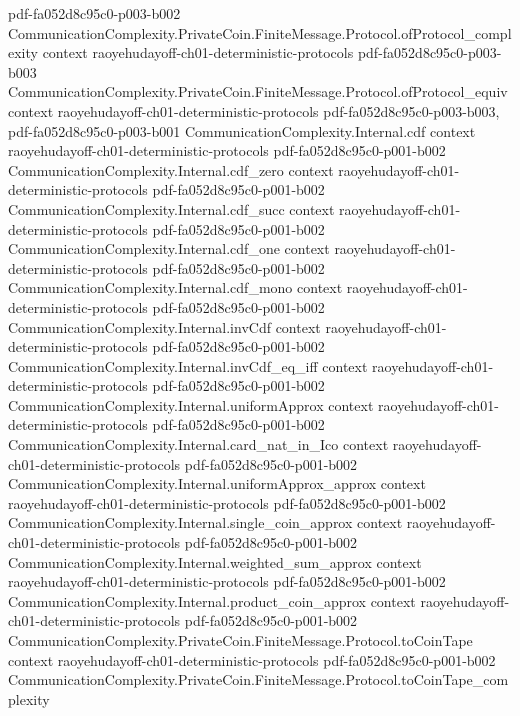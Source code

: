 \begin{theorem}
  {pdf-fa052d8c95c0-p003-b002}
\proofstep
  {CommunicationComplexity.PrivateCoin.FiniteMessage.Protocol.ofProtocol_complexity}
  {context}
  {raoyehudayoff-ch01-deterministic-protocols}
  {pdf-fa052d8c95c0-p003-b003}
\proofstep
  {CommunicationComplexity.PrivateCoin.FiniteMessage.Protocol.ofProtocol_equiv}
  {context}
  {raoyehudayoff-ch01-deterministic-protocols}
  {pdf-fa052d8c95c0-p003-b003,
    pdf-fa052d8c95c0-p003-b001}
\proofstep
  {CommunicationComplexity.Internal.cdf}
  {context}
  {raoyehudayoff-ch01-deterministic-protocols}
  {pdf-fa052d8c95c0-p001-b002}
\proofstep
  {CommunicationComplexity.Internal.cdf_zero}
  {context}
  {raoyehudayoff-ch01-deterministic-protocols}
  {pdf-fa052d8c95c0-p001-b002}
\proofstep
  {CommunicationComplexity.Internal.cdf_succ}
  {context}
  {raoyehudayoff-ch01-deterministic-protocols}
  {pdf-fa052d8c95c0-p001-b002}
\proofstep
  {CommunicationComplexity.Internal.cdf_one}
  {context}
  {raoyehudayoff-ch01-deterministic-protocols}
  {pdf-fa052d8c95c0-p001-b002}
\proofstep
  {CommunicationComplexity.Internal.cdf_mono}
  {context}
  {raoyehudayoff-ch01-deterministic-protocols}
  {pdf-fa052d8c95c0-p001-b002}
\proofstep
  {CommunicationComplexity.Internal.invCdf}
  {context}
  {raoyehudayoff-ch01-deterministic-protocols}
  {pdf-fa052d8c95c0-p001-b002}
\proofstep
  {CommunicationComplexity.Internal.invCdf_eq_iff}
  {context}
  {raoyehudayoff-ch01-deterministic-protocols}
  {pdf-fa052d8c95c0-p001-b002}
\proofstep
  {CommunicationComplexity.Internal.uniformApprox}
  {context}
  {raoyehudayoff-ch01-deterministic-protocols}
  {pdf-fa052d8c95c0-p001-b002}
\proofstep
  {CommunicationComplexity.Internal.card_nat_in_Ico}
  {context}
  {raoyehudayoff-ch01-deterministic-protocols}
  {pdf-fa052d8c95c0-p001-b002}
\proofstep
  {CommunicationComplexity.Internal.uniformApprox_approx}
  {context}
  {raoyehudayoff-ch01-deterministic-protocols}
  {pdf-fa052d8c95c0-p001-b002}
\proofstep
  {CommunicationComplexity.Internal.single_coin_approx}
  {context}
  {raoyehudayoff-ch01-deterministic-protocols}
  {pdf-fa052d8c95c0-p001-b002}
\proofstep
  {CommunicationComplexity.Internal.weighted_sum_approx}
  {context}
  {raoyehudayoff-ch01-deterministic-protocols}
  {pdf-fa052d8c95c0-p001-b002}
\proofstep
  {CommunicationComplexity.Internal.product_coin_approx}
  {context}
  {raoyehudayoff-ch01-deterministic-protocols}
  {pdf-fa052d8c95c0-p001-b002}
\proofstep
  {CommunicationComplexity.PrivateCoin.FiniteMessage.Protocol.toCoinTape}
  {context}
  {raoyehudayoff-ch01-deterministic-protocols}
  {pdf-fa052d8c95c0-p001-b002}
\proofstep
  {CommunicationComplexity.PrivateCoin.FiniteMessage.Protocol.toCoinTape_complexity}

\end{theorem}
